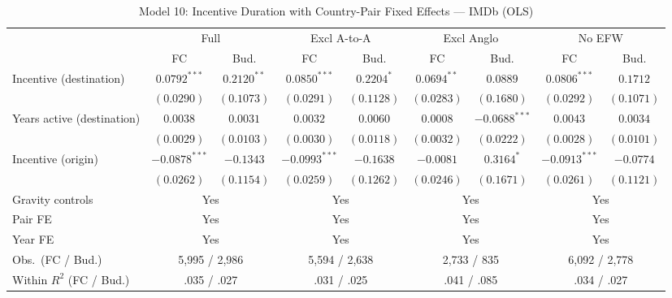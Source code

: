 \begin{table}[htbp]
\centering
\caption{Model 10: Incentive Duration with Country-Pair Fixed Effects --- IMDb (OLS)}
\label{tab:model10}
\footnotesize
\begin{tabular}{l cc cc cc cc }
\toprule
  & \multicolumn{2}{c}{Full} & \multicolumn{2}{c}{Excl A-to-A} & \multicolumn{2}{c}{Excl Anglo} & \multicolumn{2}{c}{No EFW} \\
\cmidrule(lr){2-3}
\cmidrule(lr){4-5}
\cmidrule(lr){6-7}
\cmidrule(lr){8-9}
  & FC & Bud. & FC & Bud. & FC & Bud. & FC & Bud. \\
\midrule
Incentive (destination) & $0.0792^{***}$ & $0.2120^{**}$ & $0.0850^{***}$ & $0.2204^{*}$ & $0.0694^{**}$ & $0.0889$ & $0.0806^{***}$ & $0.1712$ \\
 & $(0.0290)$ & $(0.1073)$ & $(0.0291)$ & $(0.1128)$ & $(0.0283)$ & $(0.1680)$ & $(0.0292)$ & $(0.1071)$ \\[4pt]
Years active (destination) & $0.0038$ & $0.0031$ & $0.0032$ & $0.0060$ & $0.0008$ & $-0.0688^{***}$ & $0.0043$ & $0.0034$ \\
 & $(0.0029)$ & $(0.0103)$ & $(0.0030)$ & $(0.0118)$ & $(0.0032)$ & $(0.0222)$ & $(0.0028)$ & $(0.0101)$ \\[4pt]
Incentive (origin) & $-0.0878^{***}$ & $-0.1343$ & $-0.0993^{***}$ & $-0.1638$ & $-0.0081$ & $0.3164^{*}$ & $-0.0913^{***}$ & $-0.0774$ \\
 & $(0.0262)$ & $(0.1154)$ & $(0.0259)$ & $(0.1262)$ & $(0.0246)$ & $(0.1671)$ & $(0.0261)$ & $(0.1121)$ \\[4pt]
\midrule
Gravity controls & \multicolumn{2}{c}{Yes} & \multicolumn{2}{c}{Yes} & \multicolumn{2}{c}{Yes} & \multicolumn{2}{c}{Yes} \\
Pair FE & \multicolumn{2}{c}{Yes} & \multicolumn{2}{c}{Yes} & \multicolumn{2}{c}{Yes} & \multicolumn{2}{c}{Yes} \\
Year FE & \multicolumn{2}{c}{Yes} & \multicolumn{2}{c}{Yes} & \multicolumn{2}{c}{Yes} & \multicolumn{2}{c}{Yes} \\
Obs.\ (FC / Bud.) & \multicolumn{2}{c}{5,995 / 2,986} & \multicolumn{2}{c}{5,594 / 2,638} & \multicolumn{2}{c}{2,733 / 835} & \multicolumn{2}{c}{6,092 / 2,778} \\
Within $R^2$ (FC / Bud.) & \multicolumn{2}{c}{.035 / .027} & \multicolumn{2}{c}{.031 / .025} & \multicolumn{2}{c}{.041 / .085} & \multicolumn{2}{c}{.034 / .027} \\
\bottomrule
\end{tabular}
\par\vspace{4pt}\noindent\begin{minipage}{\textwidth}

\end{minipage}
\end{table}
